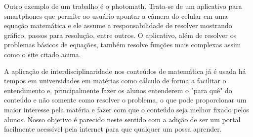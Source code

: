 \documentclass[12pt]{report}
\begin{document}
Outro exemplo de um trabalho é o photomath. Trata-se de um aplicativo para smartphones que permite ao usuário apontar a câmera do celular em uma equação matemática e ele assume a responsabilidade de resolver mostrando gráfico, passos para resolução, entre outros. O aplicativo, além de resolver os problemas básicos de equações, também resolve funções mais complexas assim como o site citado acima.

A aplicação de interdisciplinaridade nos conteúdos de matemática já é usada há tempos em universidades em matérias como cálculo de forma a facilitar o entendimento e, principalmente fazer os alunos entenderem o "para quê" do conteúdo e não somente como resolver o problema, o que pode proporcionar um maior interesse pela matéria e fazer com que o conteúdo seja melhor fixado pelos alunos. Nosso objetivo é parecido neste sentido com a adição de ser um portal facilmente acessível pela internet para que qualquer um possa aprender.
\end{document}
